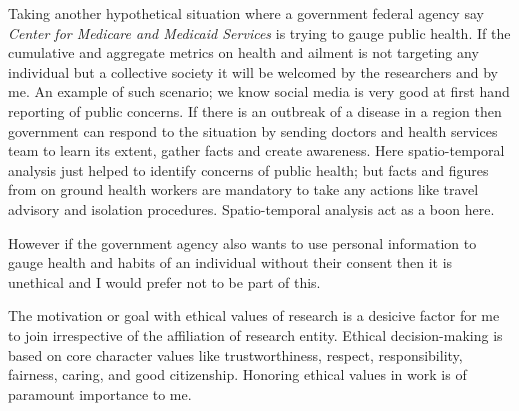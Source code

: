 Taking another hypothetical situation where a government federal agency say {\em Center for Medicare and Medicaid Services} is trying to gauge public health.
If the cumulative and aggregate metrics on health and ailment is not targeting any individual but a collective society it will be welcomed by the researchers and by me. An example of such scenario; we know social media is very good at first hand reporting of public concerns. If there is an outbreak of a disease in a region then government can respond to the situation by sending doctors and health services team to learn its extent, gather facts and create awareness. Here spatio-temporal analysis just helped to identify concerns of public health; but facts and figures from on ground health workers are mandatory to take any actions like travel advisory and isolation procedures. Spatio-temporal analysis act as a boon here.

However if the government agency also wants to use personal information to gauge health and habits of an individual without their consent then it is unethical and I would prefer not to be part of this.

The motivation or goal with ethical values of research is a desicive factor for me to join irrespective of the affiliation of research entity.
Ethical decision-making is based on core character values like trustworthiness, respect, responsibility, fairness, caring, and good citizenship.
Honoring ethical values in work is of paramount importance to me.

